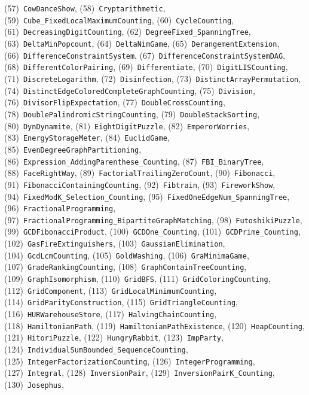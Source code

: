 \documentclass{article}
\theoremstyle{plain}
\theoremstyle{definition}
\theoremstyle{remark}
\begin{document}
\begin{flushleft}
(57)~\texttt{CowDanceShow},
(58)~\texttt{Cryptarithmetic},
(59)~\texttt{Cube\_FixedLocalMaximumCounting},
(60)~\texttt{CycleCounting},
(61)~\texttt{DecreasingDigitCounting},
(62)~\texttt{DegreeFixed\_SpanningTree},
(63)~\texttt{DeltaMinPopcount},
(64)~\texttt{DeltaNimGame},
(65)~\texttt{DerangementExtension},
(66)~\texttt{DifferenceConstraintSystem},
(67)~\texttt{DifferenceConstraintSystemDAG},
(68)~\texttt{DifferentColorPairing},
(69)~\texttt{Differentiate},
(70)~\texttt{DigitLISCounting},
(71)~\texttt{DiscreteLogarithm},
(72)~\texttt{Disinfection},
(73)~\texttt{DistinctArrayPermutation},
(74)~\texttt{DistinctEdgeColoredCompleteGraphCounting},
(75)~\texttt{Division},
(76)~\texttt{DivisorFlipExpectation},
(77)~\texttt{DoubleCrossCounting},
(78)~\texttt{DoublePalindromicStringCounting},
(79)~\texttt{DoubleStackSorting},
(80)~\texttt{DynDynamite},
(81)~\texttt{EightDigitPuzzle},
(82)~\texttt{EmperorWorries},
(83)~\texttt{EnergyStorageMeter},
(84)~\texttt{EuclidGame},
(85)~\texttt{EvenDegreeGraphPartitioning},
(86)~\texttt{Expression\_AddingParenthese\_Counting},
(87)~\texttt{FBI\_BinaryTree},
(88)~\texttt{FaceRightWay},
(89)~\texttt{FactorialTrailingZeroCount},
(90)~\texttt{Fibonacci},
(91)~\texttt{FibonacciContainingCounting},
(92)~\texttt{Fibtrain},
(93)~\texttt{FireworkShow},
(94)~\texttt{FixedModK\_Selection\_Counting},
(95)~\texttt{FixedOneEdgeNum\_SpanningTree},
(96)~\texttt{FractionalProgramming},
(97)~\texttt{FractionalProgramming\_BipartiteGraphMatching},
(98)~\texttt{FutoshikiPuzzle},
(99)~\texttt{GCDFibonacciProduct},
(100)~\texttt{GCDOne\_Counting},
(101)~\texttt{GCDPrime\_Counting},
(102)~\texttt{GasFireExtinguishers},
(103)~\texttt{GaussianElimination},
(104)~\texttt{GcdLcmCounting},
(105)~\texttt{GoldWashing},
(106)~\texttt{GraMinimaGame},
(107)~\texttt{GradeRankingCounting},
(108)~\texttt{GraphContainTreeCounting},
(109)~\texttt{GraphIsomorphism},
(110)~\texttt{GridBFS},
(111)~\texttt{GridColoringCounting},
(112)~\texttt{GridComponent},
(113)~\texttt{GridLocalMinimumCounting},
(114)~\texttt{GridParityConstruction},
(115)~\texttt{GridTriangleCounting},
(116)~\texttt{HURWarehouseStore},
(117)~\texttt{HalvingChainCounting},
(118)~\texttt{HamiltonianPath},
(119)~\texttt{HamiltonianPathExistence},
(120)~\texttt{HeapCounting},
(121)~\texttt{HitoriPuzzle},
(122)~\texttt{HungryRabbit},
(123)~\texttt{ImpParty},
(124)~\texttt{IndividualSumBounded\_SequenceCounting},
(125)~\texttt{IntegerFactorizationCounting},
(126)~\texttt{IntegerProgramming},
(127)~\texttt{Integral},
(128)~\texttt{InversionPair},
(129)~\texttt{InversionPairK\_Counting},
(130)~\texttt{Josephus},

\end{flushleft}
\end{document}
